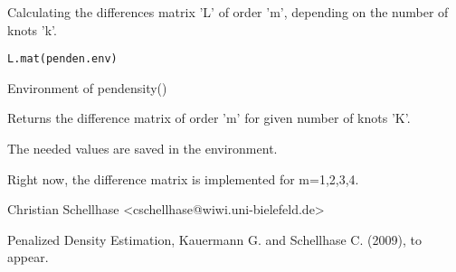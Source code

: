 \begin{Description}\relax
Calculating the differences matrix 'L' of order 'm', depending on the number of knots 'k'.
\end{Description}
\begin{Usage}
\begin{verbatim}
L.mat(penden.env)
\end{verbatim}
\end{Usage}
\begin{Arguments}
\begin{ldescription}
\item[\code{penden.env}] Environment of pendensity()
\end{ldescription}
\end{Arguments}
\begin{Value}
Returns the difference matrix of order 'm' for given number of knots 'K'.

The needed values are saved in the environment.
\end{Value}
\begin{Note}\relax
Right now, the difference matrix is implemented for m=1,2,3,4.
\end{Note}
\begin{Author}\relax
Christian Schellhase <cschellhase@wiwi.uni-bielefeld.de>
\end{Author}
\begin{References}\relax
Penalized Density Estimation, Kauermann G. and Schellhase C. (2009), to appear.
\end{References}

